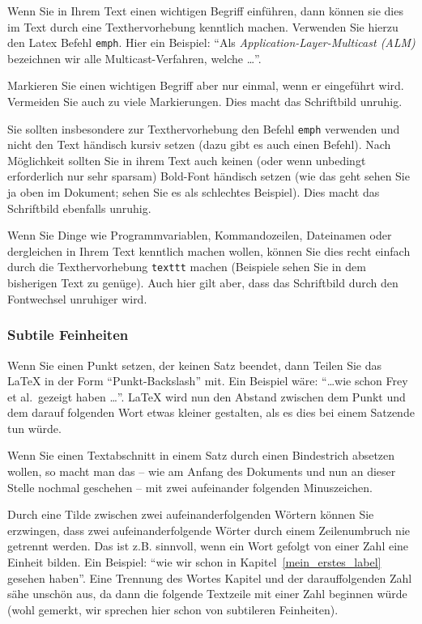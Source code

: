 \documentclass[a4paper,twoside]{IEEEtran}
\begin{document}
Wenn Sie in Ihrem Text einen wichtigen Begriff einführen, dann können sie dies im Text durch eine Texthervorhebung kenntlich machen. Verwenden Sie hierzu den Latex Befehl \texttt{emph}. Hier ein Beispiel: "`Als \emph{Application-Layer-Multicast (ALM)} bezeichnen wir alle Multicast-Verfahren, welche \dots"'.

Markieren Sie einen wichtigen Begriff aber nur einmal, wenn er eingeführt wird. Vermeiden Sie auch zu viele Markierungen. Dies macht das Schriftbild unruhig.

Sie sollten insbesondere zur Texthervorhebung den Befehl \texttt{emph} verwenden und nicht den Text händisch kursiv setzen (dazu gibt es auch einen Befehl). Nach Möglichkeit sollten Sie in ihrem Text auch keinen (oder wenn unbedingt erforderlich nur sehr sparsam) Bold-Font händisch setzen (wie das geht sehen Sie ja oben im Dokument; sehen Sie es als schlechtes Beispiel). Dies macht das Schriftbild ebenfalls unruhig.

Wenn Sie Dinge wie Programmvariablen, Kommandozeilen, Dateinamen oder dergleichen in Ihrem Text kenntlich machen wollen, können Sie dies recht einfach durch die Texthervorhebung \texttt{texttt} machen (Beispiele sehen Sie in dem bisherigen Text zu genüge). Auch hier gilt aber, dass das Schriftbild durch den Fontwechsel unruhiger wird.


\subsubsection{Subtile Feinheiten}

Wenn Sie einen Punkt setzen, der keinen Satz beendet, dann Teilen Sie das LaTeX in der Form "`Punkt-Backslash"' mit. Ein Beispiel wäre: "`\dots wie schon Frey et al.\ gezeigt haben \dots"'. LaTeX wird nun den Abstand zwischen dem Punkt und dem darauf folgenden Wort etwas kleiner gestalten, als es dies bei einem Satzende tun würde.

Wenn Sie einen Textabschnitt in einem Satz durch einen Bindestrich absetzen wollen, so macht man das -- wie am Anfang des Dokuments und nun an dieser Stelle nochmal geschehen -- mit zwei aufeinander folgenden Minuszeichen.

Durch eine Tilde zwischen zwei aufeinanderfolgenden Wörtern können Sie erzwingen, dass zwei aufeinanderfolgende Wörter durch einem Zeilenumbruch nie getrennt werden. Das ist z.B. sinnvoll, wenn ein Wort gefolgt von einer Zahl eine Einheit bilden. Ein Beispiel: "`wie wir schon in Kapitel~\ref{mein_erstes_label} gesehen haben"'. Eine Trennung des Wortes Kapitel und der darauffolgenden Zahl sähe unschön aus, da dann die folgende Textzeile mit einer Zahl beginnen würde (wohl gemerkt, wir sprechen hier schon von subtileren Feinheiten).
\end{document}
